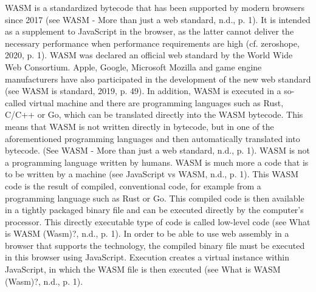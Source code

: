 WASM is a standardized bytecode that has been supported by modern browsers since 2017 (see WASM - More than just a web standard, n.d., p. 1). It is intended as a supplement to JavaScript in the browser, as the latter cannot deliver the necessary performance when performance requirements are high (cf. zeroshope, 2020, p. 1).
WASM was declared an official web standard by the World Wide Web Consortium. Apple, Google, Microsoft Mozilla and game engine manufacturers have also participated in the development of the new web standard (see \dq WASM is standard\dq, 2019, p. 49).
In addition, WASM is executed in a so-called virtual machine and there are programming languages such as Rust, C/C++ or Go, which can be translated directly into the WASM bytecode. This means that WASM is not written directly in bytecode, but in one of the aforementioned programming languages and then automatically translated into bytecode. (See WASM - More than just a web standard, n.d., p. 1).
WASM is not a programming language written by humans. WASM is much more a code that is to be written by a machine (see JavaScript vs WASM, n.d., p. 1). This WASM code is the result of compiled, conventional code, for example from a programming language such as Rust or Go. This compiled code is then available in a tightly packaged binary file and can be executed directly by the computer's processor. This directly executable type of code is called low-level code (see What is WASM (Wasm)?, n.d., p. 1).
In order to be able to use web assembly in a browser that supports the technology, the compiled binary file must be executed in this browser using JavaScript. Execution creates a virtual instance within JavaScript, in which the WASM file is then executed (see What is WASM (Wasm)?, n.d., p. 1).
